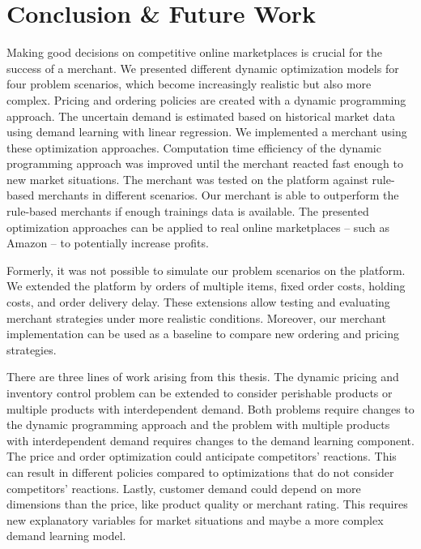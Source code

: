 
\chapter{Conclusion \& Future Work}

Making good decisions on competitive online marketplaces is crucial for the success of a merchant.
We presented different dynamic optimization models for four problem scenarios, which become increasingly realistic but also more complex.
Pricing and ordering policies are created with a dynamic programming approach.
The uncertain demand is estimated based on historical market data using demand learning with linear regression.
We implemented a merchant using these optimization approaches.
Computation time efficiency of the dynamic programming approach was improved until the merchant reacted fast enough  to new market situations.
The merchant was tested on the \pricewars platform against rule-based merchants in different scenarios.
Our merchant is able to outperform the rule-based merchants if enough trainings data is available.
The presented optimization approaches can be applied to real online marketplaces -- such as Amazon -- to potentially increase profits.

Formerly, it was not possible to simulate our problem scenarios on the \pricewars platform.
We extended the platform by orders of multiple items, fixed order costs, holding costs, and order delivery delay.
These extensions allow testing and evaluating merchant strategies under more realistic conditions.
Moreover, our merchant implementation can be used as a baseline to compare new ordering and pricing strategies.

There are three lines of work arising from this thesis.
The dynamic pricing and inventory control problem can be extended to consider perishable products or multiple products with interdependent demand.
Both problems require changes to the dynamic programming approach and the problem with multiple products with interdependent demand requires changes to the demand learning component.
The price and order optimization could anticipate competitors' reactions.
This can result in different policies compared to optimizations that do not consider competitors' reactions.
Lastly, customer demand could depend on more dimensions than the price, like product quality or merchant rating.
This requires new explanatory variables for market situations and maybe a more complex demand learning model.



